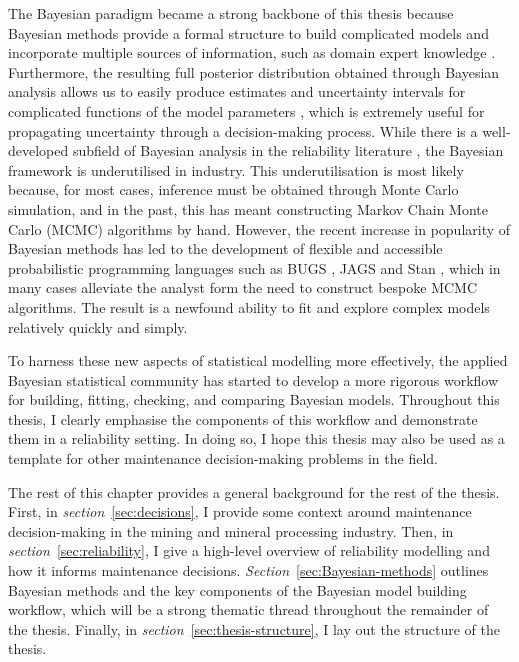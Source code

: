 The Bayesian paradigm became a strong backbone of this thesis because Bayesian methods provide a formal structure to build complicated models and incorporate multiple sources of information, such as domain expert knowledge \citep{meeker2022}. Furthermore, the resulting full posterior distribution obtained through Bayesian analysis allows us to easily produce estimates and uncertainty intervals for complicated functions of the model parameters \citep{meeker2022}, which is extremely useful for propagating uncertainty through a decision-making process. While there is a well-developed subfield of Bayesian analysis in the reliability literature \citep{hamada2008, meeker2022}, the Bayesian framework is underutilised in industry. This underutilisation is most likely because, for most cases, inference must be obtained through Monte Carlo simulation, and in the past, this has meant constructing Markov Chain Monte Carlo (MCMC) algorithms by hand. However, the recent increase in popularity of Bayesian methods has led to the development of flexible and accessible probabilistic programming languages such as BUGS \citep{lunn2012}, JAGS \citep{plummer2003} and Stan \citep{Stan2022}, which in many cases alleviate the analyst form the need to construct bespoke MCMC algorithms. The result is a newfound ability to fit and explore complex models relatively quickly and simply.  

To harness these new aspects of statistical modelling more effectively, the applied Bayesian statistical community has started to develop a more rigorous workflow for building, fitting, checking, and comparing Bayesian models. Throughout this thesis, I clearly emphasise the components of this workflow and demonstrate them in a reliability setting. In doing so, I hope this thesis may also be used as a template for other maintenance decision-making problems in the field.

The rest of this chapter provides a general background for the rest of the thesis. First, in \textit{section}~\ref{sec:decisions}, I provide some context around maintenance decision-making in the mining and mineral processing industry. Then, in \textit{section}~\ref{sec:reliability}, I give a high-level overview of reliability modelling and how it informs maintenance decisions. \textit{Section}~\ref{sec:Bayesian-methods} outlines Bayesian methods and the key components of the Bayesian model building workflow, which will be a strong thematic thread throughout the remainder of the thesis. Finally, in \textit{section}~\ref{sec:thesis-structure}, I lay out the structure of the thesis.

